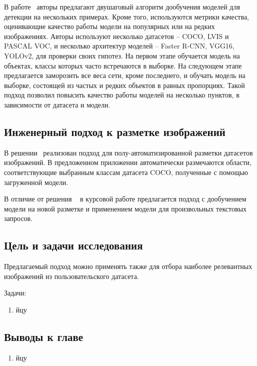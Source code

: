 \documentclass[a4paper,14pt]{article}
\begin{document}
    В работе~\cite{wang2020few} авторы предлагают двушаговый алгоритм дообучения моделей для детекции на нескольких примерах.
    Кроме того, используются метрики качества, оценивающие качество работы модели на популярных или на редких изображениях.
    Авторы используют несколько датасетов -- COCO, LVIS и PASCAL VOC,
    и несколько архитектур моделей -- Faster R-CNN, VGG16, YOLOv2, для проверки своих гипотез.
    На первом этапе обучается модель на объектах, классы которых часто встречаются в выборке.
    На следующем этапе предлагается заморозить все веса сети, кроме последнего, и обучать модель на выборке, состоящей из частых и редких объектов в равных пропорциях.
    Такой подход позволил повысить качество работы моделей на несколько пунктов, в зависимости от датасета и модели.
    

    \subsection{Инженерный подход к разметке изображений}

    В решении~\cite{AnnoMage} реализован подход для полу-автоматизированной разметки датасетов изображений. 
    В предложенном приложении автоматически размечаются области, соответствующие выбранным классам датасета COCO, полученные с помощью загруженной модели.

    В отличие от решения ~\cite{AnnoMage} в курсовой работе предлагается подход с дообучением модели на новой разметке и применением модели для произвольных текстовых запросов.

    \subsection{Цель и задачи исследования}
    
    Предлагаемый подход можно применять также для отбора наиболее релевантных изображений из пользовательского датасета.

    Задачи:
    \begin{enumerate}
        [1)]
        \itemsep0em
        \item йцу

    \end{enumerate}

    \subsection{Выводы к главе \thesection}
    \begin{enumerate}
        [1)]
        \itemsep0em
        \item йцу
    \end{enumerate}
\end{document}

